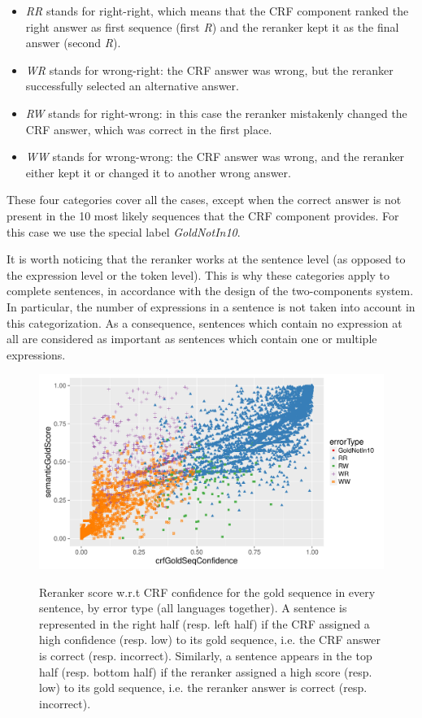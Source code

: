 \documentclass[output=paper,modfonts,nonflat]{langsci/langscibook}
\begin{document}
\begin{itemize}
\item {\it RR} stands for right-right, which means that the CRF
  component ranked the right answer as first sequence (first {\it R})
  and the reranker kept it as the final answer (second {\it R}).
\item {\it WR} stands for wrong-right: the CRF answer was wrong, but
  the reranker successfully selected an alternative answer.
\item {\it RW} stands for right-wrong: in this case the reranker
  mistakenly changed the CRF answer, which was correct in the first
  place.
\item {\it WW} stands for wrong-wrong: the CRF answer was wrong, and
  the reranker either kept it or changed it to another wrong answer.
\end{itemize}

These four categories cover all the cases, except when the correct
answer is not present in the 10 most likely sequences that the CRF
component provides. For this case we use the special label {\it
  GoldNotIn10}.

It is worth noticing that the reranker works at the sentence level (as
opposed to the expression level or the token level). This is why these
categories apply to complete sentences, in accordance with the design
of the two-components system. In particular, the number of expressions
in a sentence is not taken into account in this categorization. As a
consequence, sentences which contain no expression at all are
considered as important as sentences which contain one or multiple
expressions.


\begin{figure} 
      {\includegraphics[width=\textwidth]{figures/graph-points-gold-confidence-vs-score-by-error-type.pdf}}
      {\caption{{ Reranker score w.r.t CRF confidence for the gold
            sequence in every sentence, by error type (all languages
            together).} A sentence is represented in the right half
          (resp. left half) if the CRF assigned a high confidence
          (resp. low) to its gold sequence, i.e. the CRF answer is
          correct (resp. incorrect). Similarly, a sentence appears in
          the top half (resp. bottom half) if the reranker assigned a
          high score (resp. low) to its gold sequence, i.e. the
          reranker answer is correct
          (resp. incorrect).\protect\footnotemark
        }\label{fig:goldConfidenceVsScoreByError}} 
\end{figure}
\end{document}
